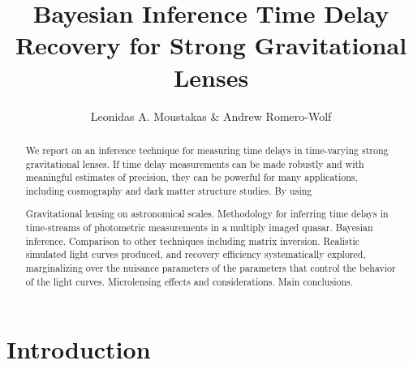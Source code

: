 \documentclass{emulateapj}
\begin{document}
\title{Bayesian Inference Time Delay Recovery for Strong Gravitational Lenses}

\author{Leonidas A. Moustakas \& Andrew Romero-Wolf}

\begin{abstract}
We report on an inference technique for measuring time delays
in time-varying strong gravitational lenses. If time delay
measurements can be made robustly and with meaningful estimates of
precision, they can be powerful for many applications, including 
cosmography and dark matter structure studies. By using 

  Gravitational  lensing  on   astronomical  scales.  Methodology  for
  inferring time delays in time-streams of photometric measurements in
  a multiply  imaged quasar.  Bayesian inference.  Comparison to other
  techniques  including matrix  inversion.  Realistic  simulated light
  curves  produced, and  recovery efficiency  systematically explored,
  marginalizing over  the nuisance  parameters of the  parameters that
  control the behavior of  the light curves.  Microlensing effects and
  considerations.  Main conclusions.
\end{abstract}
 

\section{Introduction}


\end{document}
